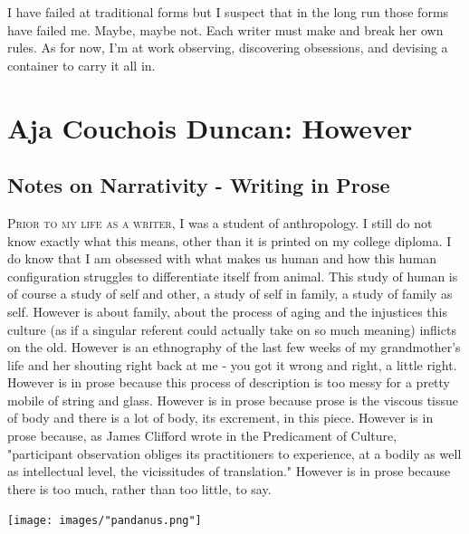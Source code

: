 \documentclass[
]{memoir}
\begin{document}
I have failed at traditional forms but I suspect that in the long run
those forms have failed me. Maybe, maybe not. Each writer must make and
break her own rules. As for now, I'm at work observing, discovering
obsessions, and devising a container to carry it all in.

\hypertarget{aja-couchois-duncan-however}{%
\chapter{Aja Couchois Duncan:
However}\label{aja-couchois-duncan-however}}

\hypertarget{notes-on-narrativity---writing-in-prose}{%
\section*{Notes on Narrativity - Writing in
Prose}\label{notes-on-narrativity---writing-in-prose}}

\lettrine[lines=3, findent=0em, nindent=0.1em, lhang=0]{P}{rior to my life as a writer,}
I was a student of anthropology. I still do not know exactly what this
means, other than it is printed on my college diploma. I do know that I
am obsessed with what makes us human and how this human configuration
struggles to differentiate itself from animal. This study of human is of
course a study of self and other, a study of self in family, a study of
family as self. However is about family, about the process of aging and
the injustices this culture (as if a singular referent could actually
take on so much meaning) inflicts on the old. However is an ethnography
of the last few weeks of my grandmother's life and her shouting right
back at me - you got it wrong and right, a little right. However is in
prose because this process of description is too messy for a pretty
mobile of string and glass. However is in prose because prose is the
viscous tissue of body and there is a lot of body, its excrement, in
this piece. However is in prose because, as James Clifford wrote in the
Predicament of Culture, "participant observation obliges its
practitioners to experience, at a bodily as well as intellectual level,
the vicissitudes of translation." However is in prose because there is
too much, rather than too little, to say.

\begin{center}\texttt{[image: images/"pandanus.png"]}\end{center}
\end{document}
